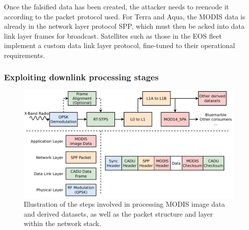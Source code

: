 Once the falsified data has been created, the attacker needs to reencode it according to the packet protocol used.
For Terra and Aqua, the MODIS data is already in the network layer protocol SPP, which must then be acked into data link layer frames for broadcast.
Satellites such as those in the EOS fleet implement a custom data link layer protocol, fine-tuned to their operational requirements.




\subsubsection{Exploiting downlink processing stages}

\begin{figure}
    \centering
    \includegraphics[width=\linewidth]{diagrams/attack_types.pdf}
    \caption{Illustration of the steps involved in processing MODIS image data and derived datasets, as well as the packet structure and layer within the network stack.}
    \label{fig:attack_types}
\end{figure}


